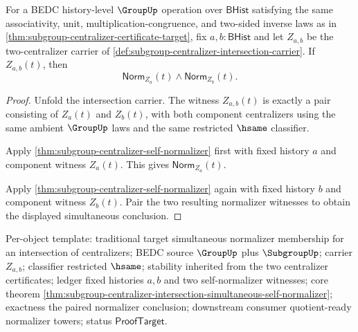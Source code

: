 \begin{theorem}
\label{thm:subgroup-centralizer-intersection-simultaneous-self-normalizer}
For a BEDC history-level $\GroupUp$ operation over $\mathsf{BHist}$
satisfying the same associativity, unit, multiplication-congruence, and
two-sided inverse laws as in
\autoref{thm:subgroup-centralizer-certificate-target}, fix
$a,b:\mathsf{BHist}$ and let $Z_{a,b}$ be the two-centralizer carrier of
\autoref{def:subgroup-centralizer-intersection-carrier}. If
$Z_{a,b}(t)$, then
$$
\mathsf{Norm}_{Z_a}(t)\land\mathsf{Norm}_{Z_b}(t).
$$
\end{theorem}
\begin{proof}
Unfold the intersection carrier. The witness $Z_{a,b}(t)$ is exactly a pair
consisting of $Z_a(t)$ and $Z_b(t)$, with both component centralizers using the
same ambient $\GroupUp$ laws and the same restricted $\hsame$ classifier.

Apply \autoref{thm:subgroup-centralizer-self-normalizer} first with fixed
history $a$ and component witness $Z_a(t)$. This gives
$\mathsf{Norm}_{Z_a}(t)$.

Apply \autoref{thm:subgroup-centralizer-self-normalizer} again with fixed
history $b$ and component witness $Z_b(t)$. Pair the two resulting normalizer
witnesses to obtain the displayed simultaneous conclusion.
\end{proof}

Per-object template: traditional target simultaneous normalizer membership for
an intersection of centralizers; BEDC source $\GroupUp$ plus $\SubgroupUp$;
carrier $Z_{a,b}$; classifier restricted $\hsame$; stability inherited from
the two centralizer certificates; ledger fixed histories $a,b$ and two
self-normalizer witnesses; core theorem
\autoref{thm:subgroup-centralizer-intersection-simultaneous-self-normalizer};
exactness the paired normalizer conclusion; downstream consumer quotient-ready
normalizer towers; status $\mathsf{ProofTarget}$.

